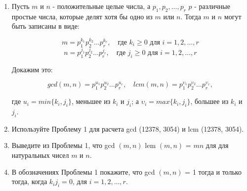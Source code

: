 \documentclass[11pt]{article}
\begin{document}
\begin{enumerate}
	\item Пусть $m$ и $n$ - положительные целые числа, а $p_{1},p_{2},\ldots,p_{r}$ $p$ - различные простые числа, которые делят хотя бы одно из $m$ или $n$. Тогда $m$ и $n$ могут быть записаны в виде:
	
	$${m = p_{1}^{k_{1}}p_{2}^{k_{2}}\ldots p_{r}^{k_{r}},\quad \text{где } k_{i}\ge0 \text{ для } i = 1,2,\ldots,r}$$ 
	$${n = p_{1}^{j_{1}}p_{2}^{j_{2}}\ldots p_{r}^{j_{r}},\quad \text{где } j_{i}\ge0 \text{ для } i = 1,2,\ldots,r}$$
	
	Докажим это:
	
	\setlength{\parskip}{1ex}
	
	$${gcd (m,n) = p_{1}^{u_{1}}p_{2}^{u_{2}}\ldots p_{r}^{u_{r}},\quad lcm(m,n) = p_{1}^{\upsilon_{1}}p_{2}^{\upsilon_{2}}\ldots p_{r}^{\upsilon_{r}}},$$
	
	\setlength{\parskip}{1ex}
		
	где $u_{i} = min \{k_{i},j_{i}\}$, меньшее из $ k_{i} $ и $ j_{i} $; а $\upsilon_{i} = max \{k_{i},j_{i}\}$, большее из $ k_{i} $ и $ j_{i} $.
	
	
	\item Используйте Проблему 1 для расчета gcd (12378, 3054) и lcm (12378, 3054).
	
	\item Выведите из Проблемы 1, что gcd $(m, n)$ lem $(m, n)$ = $mn$ для для натуральных чисел $m$ и $n$.
	
	\item В обозначениях Проблемы 1 покажите, что gcd $(m, n)$ = 1 тогда и только тогда, когда $k_{i}j_{i} = 0$, для $i = 1,2,\ldots,r$.
	 

\end{enumerate}
\end{document}
